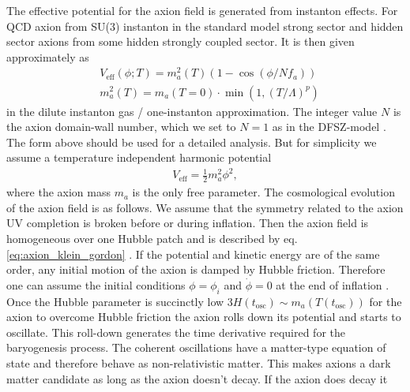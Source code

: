 \documentclass[13pt,a4paper,twoside,titlepage]{article}
\begin{document}
The effective potential for the axion field is generated from instanton effects.
For QCD axion from SU(3) instanton in the standard model strong sector and hidden sector axions from some hidden strongly coupled sector. It is then given approximately as \cite[sec. 2.2]{Axion_Cosmology_Marsh_2016}
\begin{align}
   &V_\mathrm{eff}(\phi; T) = m_a^2(T) (1 - \cos(\phi / N f_a)) \\
   &m_a^2(T) = m_a(T = 0) \cdot \min\left(1, \left( T / \Lambda \right)^p \right)
\end{align}
in the dilute instanton gas / one-instanton approximation.
The integer value $N$ is the axion domain-wall number, which we set to $N = 1$ as in the DFSZ-model \cite[sec. 2.7]{Di_Luzio_2020_Landscape_of_QCD_Axion_models}.
The form above should be used for a detailed analysis. But for simplicity we assume a temperature independent harmonic potential
\begin{align}
    V_\mathrm{eff} = \frac{1}{2} m_a^2 \phi^2,
\end{align}
where the axion mass $m_a$ is the only free parameter.
The cosmological evolution of the axion field is as follows. We assume that the
symmetry related to the axion UV completion is broken before or during inflation.
Then the axion field is homogeneous over one Hubble patch and is described by eq. \eqref{eq:axion_klein_gordon} \cite[sec. 4, eps. 4.7]{Axion_Cosmology_Marsh_2016}.
If the potential and kinetic energy are of the same order, any initial motion of the axion is damped by Hubble friction. Therefore one can assume the initial conditions $\phi = \phi_i$ and $\dot{\phi} = 0$ at the end of inflation \cite[sec. IV.A]{Axion_cosmology_Wantz_2010}.
Once the Hubble parameter is succinctly low $3 H(t_\mathrm{osc}) \sim m_a(T(t_\mathrm{osc}))$ for the axion to overcome Hubble friction the axion rolls down its potential and starts to oscillate. This roll-down generates the time derivative
required for the baryogenesis process.
The coherent oscillations have a matter-type equation of state and therefore behave as non-relativistic matter. This makes axions a dark matter candidate as long as the axion
doesn't decay.
If the axion does decay it
\end{document}
